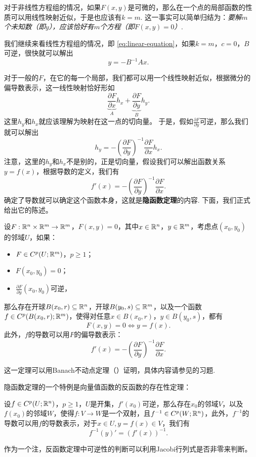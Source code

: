 对于非线性方程组的情况，如果$F(x,y)$是可微的，那么在一个点的局部函数的性质可以用线性映射近似，于是也应该有$k=m$. 这一事实可以简单归结为：\emph{要解$m$个未知数（即$y$），应该恰好有$m$个方程（即$F(x,y)=0$）}.

我们继续来看线性方程组的情况，即 \eqref{eq:linear-equation}，如果$k=m$，$c=0$，$B$可逆，很快就可以解出
\[y=-B^{-1}Ax.\]

对于一般的$F$，在它的每一个局部，我们都可以用一个线性映射近似，根据微分的偏导数表示，这一线性映射恰好形如
\[\underbrace{\frac{\partial F}{\partial x}}_A h_x+\underbrace{\frac{\partial F}{\partial y}}_B h_y.\]
这里$h_y$和$h_x$就应该理解为映射在这一点的切向量。
于是，假如$\frac{\partial F}{\partial y}$可逆，那么我们就可以解出
\[h_y=-\left(\frac{\partial F}{\partial y}\right)^{-1}\frac{\partial F}{\partial x}h_x.\]
注意，这里的$h_y$和$h_x$不是别的，正是切向量，假设我们可以解出函数关系$y=f(x)$，根据导数的定义，我们有
\[f'(x)=-\left(\frac{\partial F}{\partial y}\right)^{-1}\frac{\partial F}{\partial x}.\]
确定了导数就可以确定这个函数本身，这就是\textbf{隐函数定理}的内容. 下面，我们正式给出它的陈述。

\begin{theorem}[隐函数定理]\label{thm:implicit-function}
    设$F:\mathbb{R}^n\times\mathbb{R}^m\to\mathbb{R}^m$，$F(x,y)=0$，其中$x\in\mathbb{R}^n$，$y\in\mathbb{R}^m$，考虑点$(x_0,y_0)$的邻域$U$，如果：
    \begin{itemize}
        \item $F\in C^p(U;\mathbb{R}^m)$，$p\geq 1$；
        \item $F(x_0,y_0)=0$；
        \item $\frac{\partial F}{\partial y}(x_0,y_0)$可逆，
    \end{itemize}
    那么存在开球$B(x_0,r)\subseteq\mathbb{R}^n$，开球$B(y_0,s)\subseteq\mathbb{R}^m$，以及一个函数$f\in C^p(B(x_0,r);\mathbb{R}^m)$，使得对任意$x\in B(x_0,r)$，$y\in B(y_0,s)$，都有
    \[F(x,y)=0\iff y=f(x).\]
    此外，$f$的导数可以用$F$的偏导数表示：
    \[f'(x)=-\left(\frac{\partial F}{\partial y}\right)^{-1}\frac{\partial F}{\partial x}.\]
\end{theorem}
这一定理可以用Banach不动点定理（）证明，具体内容请参见的习题. 

隐函数定理的一个特例是向量值函数的反函数的存在性定理：

\begin{theorem}[反函数定理]\label{thm:inverse-function}
    设$f\in C^p(U;\mathbb{R}^n)$，$p\geq 1$，$U$是开集，$f'(x_0)$可逆，那么存在$x_0$的邻域$V$，以及$f(x_0)$的邻域$W$，使得$f:V\to W$是一个双射，且$f^{-1}\in C^p(W;\mathbb{R}^n)$，此外，$f^{-1}$的导数可以用$f$的导数表示，对于$x\in U,y=f(x)\in V$，我们有
    \[f^{-1}(y)'=(f'(x))^{-1}.\]
\end{theorem}
作为一个注，反函数定理中可逆性的判断可以利用Jacobi行列式是否非零来判断。

